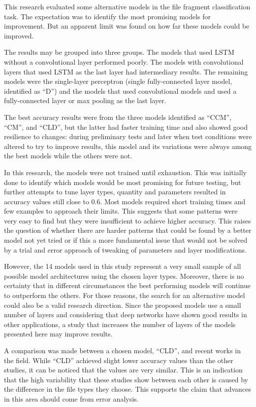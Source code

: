 This research evaluated some alternative models in the file fragment classification task. The expectation was to identify the most promising models for improvement. But an apparent limit was found on how far these models could be improved.

The results may be grouped into three groups. The models that used LSTM without a convolutional layer performed poorly. The models with convolutional layers that used LSTM as the last layer had intermediary results. The remaining models were the single-layer perceptron (single fully-connected layer model, identified as ``D'') and the models that used convolutional models and used a fully-connected layer or max pooling as the last layer.

The best accuracy results were from the three models identified as ``CCM'', ``CM'', and ``CLD'', but the latter had faster training time and also showed good resilience to changes: during preliminary tests and later when test conditions were altered to try to improve results, this model and its variations were always among the best models while the others were not.

In this research, the models were not trained until exhaustion.
This was initially done to identify which models would be most promising for future testing, but further attempts to tune layer types, quantity and parameters resulted in accuracy values still close to 0.6.
Most models required short training times and few examples to approach their limits.
This suggests that some patterns were very easy to find but they were insufficient to achieve higher accuracy.
This raises the question of whether there are harder patterns that could be found by a better model not yet tried or if this a more fundamental issue that would not be solved by a trial and error approach of tweaking of parameters and layer modifications.


However, the 14 models used in this study represent a very small sample of all possible model architectures using the chosen layer types. Moreover, there is no certainty that in different circumstances the best performing models will continue to outperform the others. For those reasons, the search for an alternative model could also be a valid research direction. Since the proposed models use a small number of layers and considering that deep networks have shown good results in other applications, a study that increases the number of layers of the models presented here may improve results.

A comparison was made between a chosen model, ``CLD'', and recent works in the field. While ``CLD'' achieved slight lower accuracy values than the other studies, it can be noticed that the values are very similar. This is an indication that the high  variability that these studies show between each other is caused by the difference in the file types they choose. This supports the claim that advances in this area should come from error analysis.

